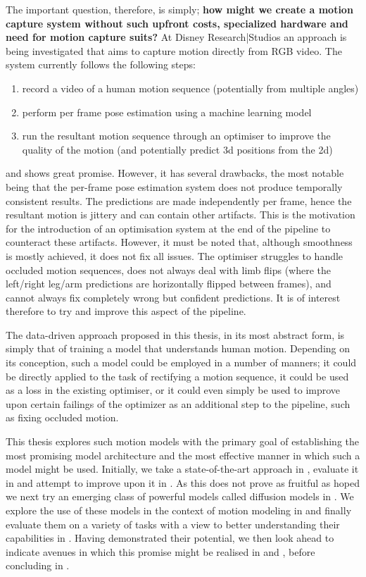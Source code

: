 The important question, therefore, is simply; \textbf{how might we create a motion capture system without such upfront costs, specialized hardware and need for motion capture suits?}
At Disney Research|Studios an approach is being investigated that aims to capture motion directly from RGB video. The system currently follows the following steps:
\begin{enumerate}
    \item record a video of a human motion sequence (potentially from multiple angles)
    \item perform per frame pose estimation using a machine learning model
    \item run the resultant motion sequence through an optimiser to improve the quality of the motion (and potentially predict 3d positions from the 2d)
\end{enumerate}
and shows great promise. However, it has several drawbacks,
the most notable being that the per-frame pose estimation system does not produce temporally consistent results. The predictions are made independently per frame, hence the resultant motion is jittery and can contain other artifacts. This is the motivation for the introduction of an optimisation system at the end of the pipeline to counteract these artifacts. However, it must be noted that, although smoothness is mostly achieved, it does not fix all issues. The optimiser struggles to handle occluded motion sequences, does not always deal with limb flips (where the left/right leg/arm predictions are horizontally flipped between frames), and cannot always fix completely wrong but confident predictions. It is of interest therefore to try and improve this aspect of the pipeline.

The data-driven approach proposed in this thesis, in its most abstract form, is simply that of training a model that understands human motion. Depending on its conception, such a model could be employed in a number of manners; it could be directly applied to the task of rectifying a motion sequence, it could be used as a loss in the existing optimiser, or it could even simply be used to improve upon certain failings of the optimizer as an additional step to the pipeline, such as fixing occluded motion.

This thesis explores such motion models with the primary goal of establishing the most promising model architecture and the most effective manner in which such a model might be used. Initially, we take a state-of-the-art approach in , evaluate it in  and attempt to improve upon it in . As this does not prove as fruitful as hoped we next try an emerging class of powerful models called diffusion models in . We explore the use of these models in the context of motion modeling in  and finally evaluate them on a variety of tasks with a view to better understanding their capabilities in . Having demonstrated their potential, we then look ahead to indicate avenues in which this promise might be realised in  and , before concluding in .
